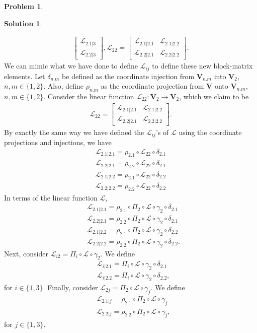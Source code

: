\documentclass{book}
\theoremstyle{definition}
\newtheorem*{prob*}{Problem}
\newtheorem*{sln*}{Solution}
\newcommand{\V}{\mathbf{V}}
\newcommand{\lag}{\mathcal{L}}
\begin{document}
\begin{prob*}
\begin{sln*}
\begin{enumerate}
\begin{align*}
\begin{bmatrix}
		\lag_{2.1|3}\\\lag_{2.2|3}
		\end{bmatrix},
		\lag_{22} = \begin{bmatrix}
		\lag_{2.1|2.1} & \lag_{2.1|2.2}\\
		\lag_{2.2|2.1} & \lag_{2.2|2.2}
		\end{bmatrix}.
		\end{align*}
		We can mimic what we have done to define $\lag_{ij}$ to define these new block-matrix elements. Let $\delta_{n.m}$ be defined as the coordinate injection from $\V_{n.m}$ into $\V_2$, $n,m \in \{1,2\}$. Also, define $\rho_{n.m}$ as the coordinate projection from $\V$ onto $\V_{n.m}$, $n,m\in \{1,2\}$. Consider the linear function $\lag_{22} : \V_2 \to \V_2$, which we claim to be
		\begin{align*}
		\lag_{22} = \begin{bmatrix}
		\lag_{2.1|2.1} & \lag_{2.1|2.2}\\
		\lag_{2.2|2.1} & \lag_{2.2|2.2}
		\end{bmatrix}.
		\end{align*}
		By exactly the same way we have defined the $\lag_{ij}$'s of $\lag$ using the coordinate projections and injections, we have
		\begin{align*}
		\lag_{2.1|2.1} = \rho_{2.1}\circ \lag_{22} \circ \delta_{2.1}\\
		\lag_{2.2|2.1} = \rho_{2.2}\circ \lag_{22} \circ \delta_{2.1}\\
		\lag_{2.1|2.2} = \rho_{2.1}\circ \lag_{22} \circ \delta_{2.2}\\
		\lag_{2.2|2.2} = \rho_{2.2}\circ \lag_{22} \circ \delta_{2.2}
		\end{align*}
		In terms of the linear function $\lag$,
		\begin{align*}
		&\lag_{2.1|2.1} = \rho_{2.1}\circ \Pi_2 \circ \lag \circ \gamma_2 \circ \delta_{2.1}\\
		&\lag_{2.2|2.1} = \rho_{2.2}\circ \Pi_2 \circ \lag \circ \gamma_2 \circ \delta_{2.1}\\
		&\lag_{2.1|2.2} = \rho_{2.1}\circ \Pi_2 \circ \lag \circ \gamma_2 \circ \delta_{2.2}\\
		&\lag_{2.2|2.2} = \rho_{2.2}\circ \Pi_2 \circ \lag \circ \gamma_2 \circ \delta_{2.2}.
		\end{align*}
		Next, consider $\lag_{i2} = \Pi_i \circ \lag \circ \gamma_2$. We define
		\begin{align*}
		&\lag_{i|2.1} = \Pi_i \circ \lag \circ \gamma_2 \circ \delta_{2.1}\\
		&\lag_{i|2.2} = \Pi_i \circ \lag \circ \gamma_2 \circ \delta_{2.2},
		\end{align*} 
		for $i\in \{1,3\}$. Finally, consider $\lag_{2j} = \Pi_2 \circ \lag \circ \gamma_j$. We define
		\begin{align*}
		&\lag_{2.1|j} = \rho_{2.1} \circ \Pi_2 \circ \lag \circ \gamma_j\\
		&\lag_{2.2|j} = \rho_{2.2} \circ \Pi_2 \circ \lag \circ \gamma_j,
		\end{align*}
		for $j \in \{1,3\}$. \\
		

\end{enumerate}
\end{sln*}
\end{prob*}
\end{document}
